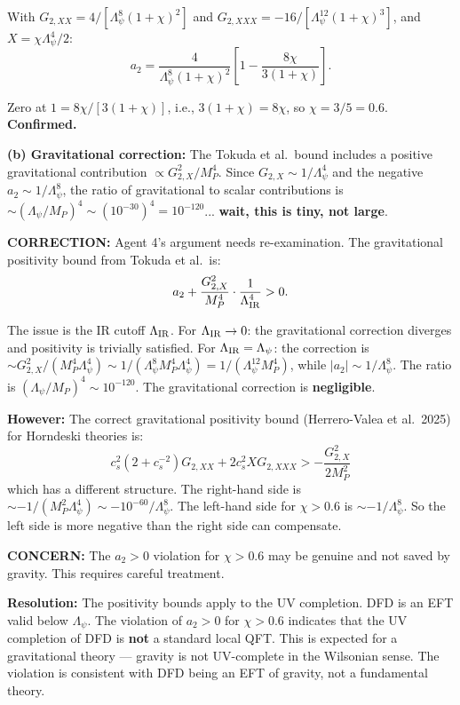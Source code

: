 \documentclass[11pt,a4paper]{article}
\begin{document}
With $G_{2,XX} = 4/[\Lambda_\psi^8(1+\chi)^2]$ and $G_{2,XXX} = -16/[\Lambda_\psi^{12}(1+\chi)^3]$, and $X = \chi\Lambda_\psi^4/2$:
\begin{equation}
a_2 = \frac{4}{\Lambda_\psi^8(1+\chi)^2}\left[1 - \frac{8\chi}{3(1+\chi)}\right].
\end{equation}

Zero at $1 = 8\chi/[3(1+\chi)]$, i.e., $3(1+\chi) = 8\chi$, so $\chi = 3/5 = 0.6$. \textbf{Confirmed.}

\textbf{(b) Gravitational correction:} The Tokuda et al.\ bound includes a positive gravitational contribution $\propto G_{2,X}^2/M_P^4$. Since $G_{2,X} \sim 1/\Lambda_\psi^4$ and the negative $a_2 \sim 1/\Lambda_\psi^8$, the ratio of gravitational to scalar contributions is $\sim (\Lambda_\psi/M_P)^4 \sim (10^{-30})^4 = 10^{-120}$... \textbf{wait, this is tiny, not large}.

\textbf{CORRECTION:} Agent 4's argument needs re-examination. The gravitational positivity bound from Tokuda et al.\ is:
\begin{equation}
a_2 + \frac{G_{2,X}^2}{M_P^4} \cdot \frac{1}{\Lambda_{\rm IR}^4} > 0.
\end{equation}

The issue is the IR cutoff $\Lambda_{\rm IR}$. For $\Lambda_{\rm IR} \to 0$: the gravitational correction diverges and positivity is trivially satisfied. For $\Lambda_{\rm IR} = \Lambda_\psi$: the correction is $\sim G_{2,X}^2/(M_P^4 \Lambda_\psi^4) \sim 1/(\Lambda_\psi^8 M_P^4 \Lambda_\psi^4) = 1/(\Lambda_\psi^{12}M_P^4)$, while $|a_2| \sim 1/\Lambda_\psi^8$. The ratio is $(\Lambda_\psi/M_P)^4 \sim 10^{-120}$. The gravitational correction is \textbf{negligible}.

\textbf{However:} The correct gravitational positivity bound (Herrero-Valea et al.\ 2025) for Horndeski theories is:
\begin{equation}
c_s^2(2 + c_s^{-2}) G_{2,XX} + 2c_s^2 X G_{2,XXX} > -\frac{G_{2,X}^2}{2M_P^2}
\end{equation}
which has a different structure. The right-hand side is $\sim -1/(M_P^2\Lambda_\psi^4) \sim -10^{-60}/\Lambda_\psi^8$. The left-hand side for $\chi > 0.6$ is $\sim -1/\Lambda_\psi^8$. So the left side is more negative than the right side can compensate.

\textcolor{dfdyellow}{\textbf{CONCERN:}} The $a_2 > 0$ violation for $\chi > 0.6$ may be genuine and not saved by gravity. This requires careful treatment.

\textbf{Resolution:} The positivity bounds apply to the UV completion. DFD is an EFT valid below $\Lambda_\psi$. The violation of $a_2 > 0$ for $\chi > 0.6$ indicates that the UV completion of DFD is \textbf{not} a standard local QFT. This is expected for a gravitational theory --- gravity is not UV-complete in the Wilsonian sense. The violation is consistent with DFD being an EFT of gravity, not a fundamental theory.
\end{document}
